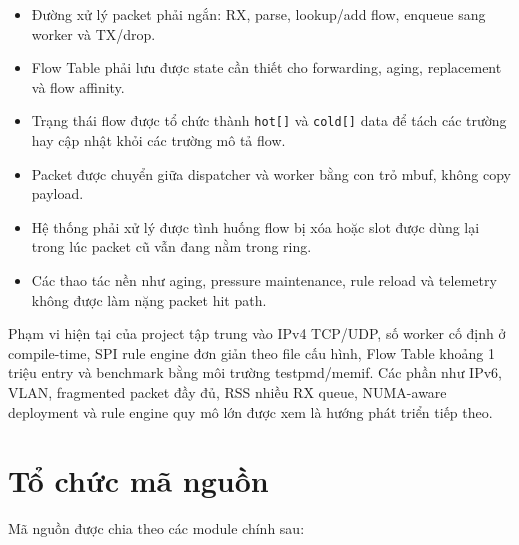 \documentclass[12pt,a4paper]{report}
\DeclareRobustCommand{\code}[1]{{\small\texttt{#1}}}
\begin{document}
\begin{itemize}
    \item Đường xử lý packet phải ngắn: RX, parse, lookup/add flow, enqueue sang worker và TX/drop.
    \item Flow Table phải lưu được state cần thiết cho forwarding, aging, replacement và flow affinity.
    \item Trạng thái flow được tổ chức thành \code{hot[]} và \code{cold[]} data để tách các trường hay cập nhật khỏi các trường mô tả flow.
    \item Packet được chuyển giữa dispatcher và worker bằng con trỏ mbuf, không copy payload.
    \item Hệ thống phải xử lý được tình huống flow bị xóa hoặc slot được dùng lại trong lúc packet cũ vẫn đang nằm trong ring.
    \item Các thao tác nền như aging, pressure maintenance, rule reload và telemetry không được làm nặng packet hit path.
\end{itemize}

Phạm vi hiện tại của project tập trung vào IPv4 TCP/UDP, số worker cố định ở compile-time, SPI rule engine đơn giản theo file cấu hình, Flow Table khoảng 1 triệu entry và benchmark bằng môi trường testpmd/memif. Các phần như IPv6, VLAN, fragmented packet đầy đủ, RSS nhiều RX queue, NUMA-aware deployment và rule engine quy mô lớn được xem là hướng phát triển tiếp theo.

\section{Tổ chức mã nguồn}

Mã nguồn được chia theo các module chính sau:
\end{document}

